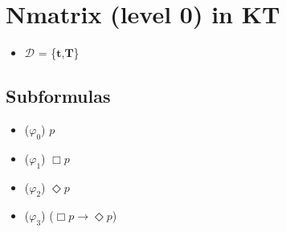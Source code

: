 \documentclass[
  14pt,
]{extarticle}
\author{}
\date{}
\providecommand{\tightlist}{%
  \setlength{\itemsep}{0pt}\setlength{\parskip}{0pt}}
\begin{document}
\hypertarget{nmatrix-level-0-in-kt}{%
\section{Nmatrix (level 0) in KT}\label{nmatrix-level-0-in-kt}}

\begin{itemize}
\tightlist
\item
  \(\mathcal{D}\) = \{\(\textbf{t}\),\(\textbf{T}\)\}
\end{itemize}

\hypertarget{subformulas}{%
\subsection{Subformulas}\label{subformulas}}

\begin{itemize}
\tightlist
\item
  (\(\varphi_{0}\)) \(p\)
\item
  (\(\varphi_{1}\)) \(\Box\)\(p\)
\item
  (\(\varphi_{2}\)) \(\Diamond\)\(p\)
\item
  (\(\varphi_{3}\)) (\(\Box\)\(p\)\(\to\)\(\Diamond\)\(p\))
\end{itemize}
\end{document}
